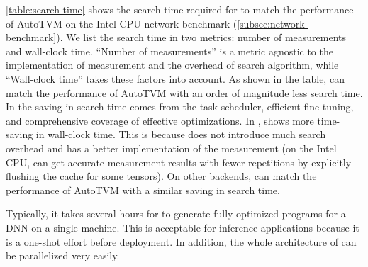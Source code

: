 \autoref{table:search-time} shows the search time required for \Ansor to match the performance of AutoTVM on the Intel CPU network benchmark (\autoref{subsec:network-benchmark}). We list the search time in two metrics: number of measurements and wall-clock time. ``Number of measurements'' is a metric agnostic to the implementation of measurement and the overhead of search algorithm, while ``Wall-clock time'' takes these factors into account.
As shown in the table, \Ansor can match the performance of AutoTVM with an order of magnitude less search time.
In  the saving in search time comes from the task scheduler, efficient fine-tuning, and comprehensive coverage of effective optimizations.
In , \Ansor shows more time-saving in wall-clock time. This is because \Ansor does not introduce much search overhead and has a better implementation of the measurement (on the Intel CPU, \Ansor can get accurate measurement results with fewer repetitions by explicitly flushing the cache for some tensors).
On other backends, \Ansor can match the performance of AutoTVM with a similar saving in search time.

Typically, it takes several hours for \Ansor to generate fully-optimized programs for a DNN on a single machine. This is acceptable for inference applications because it is a one-shot effort before deployment. In addition, the whole architecture of \Ansor can be parallelized very easily.

